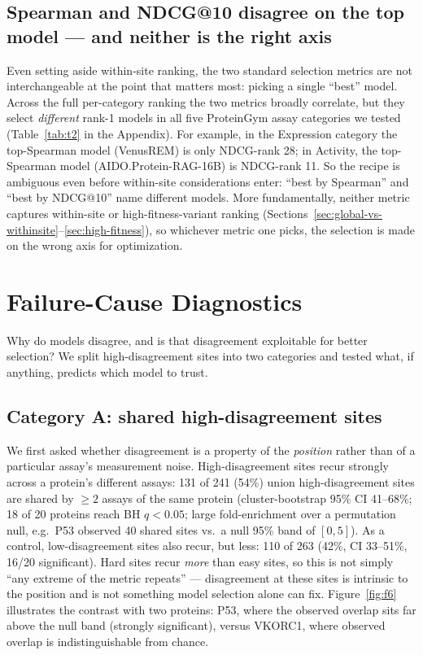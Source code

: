 \documentclass{article}
\begin{document}
\subsection{Spearman and NDCG@10 disagree on the top model --- and neither is the right axis}
\label{sec:metric-disagreement}

Even setting aside within-site ranking, the two standard selection metrics are not interchangeable at the point that matters most: picking a single ``best'' model. Across the full per-category ranking the two metrics broadly correlate, but they select \emph{different} rank-1 models in all five ProteinGym assay categories we tested (Table~\ref{tab:t2} in the Appendix). For example, in the Expression category the top-Spearman model (VenusREM) is only NDCG-rank 28; in Activity, the top-Spearman model (AIDO.Protein-RAG-16B) is NDCG-rank 11. So the recipe is ambiguous even before within-site considerations enter: ``best by Spearman'' and ``best by NDCG@10'' name different models. More fundamentally, neither metric captures within-site or high-fitness-variant ranking (Sections~\ref{sec:global-vs-withinsite}--\ref{sec:high-fitness}), so whichever metric one picks, the selection is made on the wrong axis for optimization.

\section{Failure-Cause Diagnostics}
\label{sec:diagnostics}

Why do models disagree, and is that disagreement exploitable for better selection? We split high-disagreement sites into two categories and tested what, if anything, predicts which model to trust.

\subsection{Category A: shared high-disagreement sites}
\label{sec:shared-sites}

We first asked whether disagreement is a property of the \emph{position} rather than of a particular assay's measurement noise. High-disagreement sites recur strongly across a protein's different assays: 131 of 241 (54\%) union high-disagreement sites are shared by $\geq 2$ assays of the same protein (cluster-bootstrap 95\% CI 41--68\%; 18 of 20 proteins reach BH $q<0.05$; large fold-enrichment over a permutation null, e.g.\ P53 observed 40 shared sites vs.\ a null 95\% band of $[0,5]$). As a control, low-disagreement sites also recur, but less: 110 of 263 (42\%, CI 33--51\%, 16/20 significant). Hard sites recur \emph{more} than easy sites, so this is not simply ``any extreme of the metric repeats'' --- disagreement at these sites is intrinsic to the position and is not something model selection alone can fix. Figure~\ref{fig:f6} illustrates the contrast with two proteins: P53, where the observed overlap sits far above the null band (strongly significant), versus VKORC1, where observed overlap is indistinguishable from chance.
\end{document}
